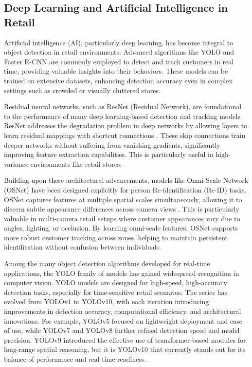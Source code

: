 {\subsection{Deep Learning and Artificial Intelligence in Retail}
Artificial intelligence (AI), particularly deep learning, has become integral to object detection in retail environments. Advanced algorithms like YOLO and Faster R-CNN are commonly employed to detect and track customers in real time, providing valuable insights into their behaviors. These models can be trained on extensive datasets, enhancing detection accuracy even in complex settings such as crowded or visually cluttered stores.

Residual neural networks, such as ResNet (Residual Network), are foundational to the performance of many deep learning-based detection and tracking models. ResNet addresses the degradation problem in deep networks by allowing layers to learn residual mappings with shortcut connections \citep{GeeksforGeeks2025}. These skip connections train deeper networks without suffering from vanishing gradients, significantly improving feature extraction capabilities. This is particularly useful in high-variance environments like retail stores.

Building upon these architectural advancements, models like Omni-Scale Network (OSNet) have been designed explicitly for person Re-identification (Re-ID) tasks. OSNet captures features at multiple spatial scales simultaneously, allowing it to discern subtle appearance differences across camera views \citep{Boujou2022}. This is particularly valuable in multi-camera retail setups where customer appearances vary due to angles, lighting, or occlusion. By learning omni-scale features, OSNet supports more robust customer tracking across zones, helping to maintain persistent identification without confusion between individuals.

Among the many object detection algorithms developed for real-time applications, the YOLO family of models has gained widespread recognition in computer vision. YOLO models are designed for high-speed, high-accuracy detection tasks, especially for time-sensitive retail scenarios. The series has evolved from YOLOv1 to YOLOv10, with each iteration introducing improvements in detection accuracy, computational efficiency, and architectural innovations. For example, YOLOv5 focused on lightweight deployment and ease of use, while YOLOv7 and YOLOv8 further refined detection speed and model precision. YOLOv9 introduced the effective use of transformer-based modules for long-range spatial reasoning, but it is YOLOv10 that currently stands out for its balance of performance and real-time readiness.

}
